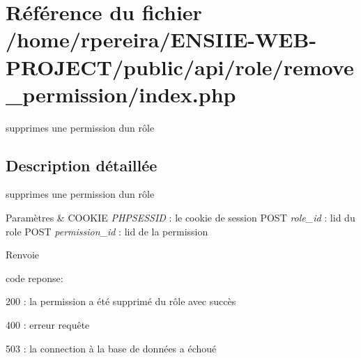 \hypertarget{role_2remove__permission_2index_8php}{}\section{Référence du fichier /home/rpereira/\+E\+N\+S\+I\+I\+E-\/\+W\+E\+B-\/\+P\+R\+O\+J\+E\+C\+T/public/api/role/remove\+\_\+permission/index.php}
\label{role_2remove__permission_2index_8php}


supprimes une permission d\textquotesingle{}un rôle  




\subsection{Description détaillée}
supprimes une permission d\textquotesingle{}un rôle 


\begin{DoxyParams}{Paramètres}
{\em } & C\+O\+O\+K\+IE {\itshape P\+H\+P\+S\+E\+S\+S\+ID} \+: le cookie de session P\+O\+ST {\itshape role\+\_\+id} \+: l\textquotesingle{}id du role P\+O\+ST {\itshape permission\+\_\+id} \+: l\textquotesingle{}id de la permission \\
\hline
\end{DoxyParams}
\begin{DoxyReturn}{Renvoie}

\begin{DoxyItemize}
\item code reponse\+:
\begin{DoxyItemize}
\item 200 \+: la permission a été supprimé du rôle avec succès
\item 400 \+: erreur requête
\item 503 \+: la connection à la base de données a échoué 
\end{DoxyItemize}
\end{DoxyItemize}
\end{DoxyReturn}
